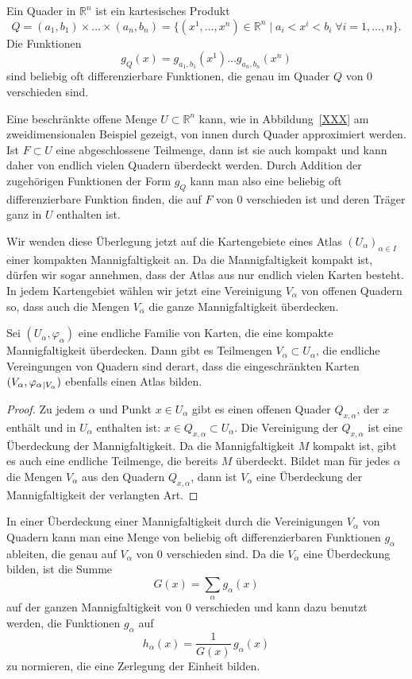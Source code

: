 Ein Quader in $\mathbb{R}^n$ ist ein kartesisches Produkt
\[
Q
=
(a_1,b_1)
\times\dots\times
(a_n,b_n)
=
\{
(x^1,\dots,x^n)\in\mathbb{R}^n
\mid
a_i < x^i < b_i
\;\forall i=1,\dots,n
\}.
\]
Die Funktionen
\[
g_Q(x)
=
g_{a_1,b_1}(x^1)\dots g_{a_n,b_n}(x^n)
\]
sind beliebig oft differenzierbare Funktionen, die genau im Quader
$Q$ von $0$ verschieden sind.

Eine beschränkte offene Menge $U\subset\mathbb{R}^n$ kann, wie in
Abbildung~\ref{XXX} am zweidimensionalen Beispiel gezeigt,
von innen durch Quader approximiert werden.
Ist $F\subset U$ eine abgeschlossene Teilmenge, dann ist sie auch
kompakt und kann daher von endlich vielen Quadern überdeckt werden.
Durch Addition der zugehörigen Funktionen der Form $g_Q$ kann man also
eine beliebig oft differenzierbare Funktion finden, die auf $F$ von
$0$ verschieden ist und deren Träger ganz in $U$ enthalten ist.

Wir wenden diese Überlegung jetzt auf die Kartengebiete eines
Atlas $(U_\alpha)_{\alpha\in I}$ einer kompakten Mannigfaltigkeit an.
Da die Mannigfaltigkeit kompakt ist, dürfen wir sogar annehmen, dass
der Atlas aus nur endlich vielen Karten besteht.
In jedem Kartengebiet wählen wir jetzt eine Vereinigung $V_\alpha$
von offenen Quadern so, dass auch die Mengen $V_\alpha$ die ganze
Mannigfaltigkeit überdecken.

\begin{satz}
Sei $(U_\alpha,\varphi_\alpha)$ eine endliche Familie von Karten,
die eine kompakte Mannigfaltigkeit überdecken.
Dann gibt es Teilmengen $V_\alpha\subset U_\alpha$, die endliche
Vereingungen von Quadern sind derart, dass die eingeschränkten Karten
$(V_\alpha,\varphi_\alpha\mathstrut_{|V_\alpha})$ ebenfalls einen Atlas
bilden.
\end{satz}

\begin{proof}
Zu jedem $\alpha$ und Punkt $x\in U_\alpha$ gibt es einen offenen
Quader $Q_{x,\alpha}$, der $x$ enthält und in $U_\alpha$ enthalten
ist: $x\in Q_{x,\alpha}\subset U_\alpha$.
Die Vereinigung der $Q_{x,\alpha}$ ist eine Überdeckung der
Mannigfaltigkeit.
Da die Mannigfaltigkeit $M$ kompakt ist, gibt es auch eine endliche 
Teilmenge, die bereits $M$ überdeckt.
Bildet man für jedes $\alpha$ die Mengen $V_\alpha$ aus den Quadern
$Q_{x,\alpha}$, dann ist $V_\alpha$ eine Überdeckung der Mannigfaltigkeit
der verlangten Art.
\end{proof}

In einer Überdeckung einer Mannigfaltigkeit durch die Vereinigungen
$V_\alpha$ von Quadern kann man eine Menge von beliebig oft
differenzierbaren Funktionen
$g_\alpha$ ableiten, die genau auf $V_\alpha$ von $0$ verschieden
sind.
Da die $V_\alpha$ eine Überdeckung bilden, ist die Summe
\[
G(x) = \sum_{\alpha} g_\alpha(x)
\]
auf der ganzen Mannigfaltigkeit von $0$ verschieden und kann dazu
benutzt werden, die Funktionen $g_\alpha$ auf
\[
h_\alpha(x) = \frac{1}{G(x)}\,g_\alpha(x)
\]
zu normieren, die eine Zerlegung der Einheit bilden.

